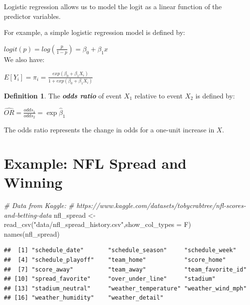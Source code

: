 \documentclass[
  11pt,
]{book}
\newenvironment{Shaded}{\begin{snugshade}}{\end{snugshade}}
\newcommand{\AttributeTok}[1]{\textcolor[rgb]{0.77,0.63,0.00}{#1}}
\newcommand{\CommentTok}[1]{\textcolor[rgb]{0.56,0.35,0.01}{\textit{#1}}}
\newcommand{\FunctionTok}[1]{\textcolor[rgb]{0.00,0.00,0.00}{#1}}
\newcommand{\NormalTok}[1]{#1}
\newcommand{\OtherTok}[1]{\textcolor[rgb]{0.56,0.35,0.01}{#1}}
\newcommand{\StringTok}[1]{\textcolor[rgb]{0.31,0.60,0.02}{#1}}
\theoremstyle{definition}
\newtheorem{definition}{Definition}[chapter]
\theoremstyle{definition}
\theoremstyle{definition}
\theoremstyle{definition}
\theoremstyle{remark}
\begin{document}
Logistic regression allows us to model the logit as a linear function of the predictor variables.

For example, a simple logistic regression model is defined by:

\(logit(p) = log\left(\frac{p}{1-p}\right) = \beta_0 + \beta_1 x\)\\

We also have:

\(E[Y_i] = \pi_i = \frac{exp(\beta_0+\beta_1X_i)}{1+exp(\beta_0+\beta_1X_i)}\)\\

\begin{definition}
The \textbf{\emph{odds ratio}} of event \(X_1\) relative to event \(X_2\) is defined by:

\(\hat{OR} = \frac{odds_1}{odds_2} = \exp{\hat{\beta}_1}\)

The odds ratio represents the change in odds for a one-unit increase in \(X\).\\

\end{definition}

\newpage

\hypertarget{example-nfl-spread-and-winning}{%
\section{Example: NFL Spread and Winning}\label{example-nfl-spread-and-winning}}

\begin{Shaded}
\begin{Highlighting}[]
\CommentTok{\# Data from Kaggle:}
\CommentTok{\# https://www.kaggle.com/datasets/tobycrabtree/nfl{-}scores{-}and{-}betting{-}data}
\NormalTok{nfl\_spread }\OtherTok{\textless{}{-}} \FunctionTok{read\_csv}\NormalTok{(}\StringTok{"data/nfl\_spread\_history.csv"}\NormalTok{,}\AttributeTok{show\_col\_types =}\NormalTok{ F)}
\FunctionTok{names}\NormalTok{(nfl\_spread)}
\end{Highlighting}
\end{Shaded}

\begin{verbatim}
##  [1] "schedule_date"       "schedule_season"     "schedule_week"      
##  [4] "schedule_playoff"    "team_home"           "score_home"         
##  [7] "score_away"          "team_away"           "team_favorite_id"   
## [10] "spread_favorite"     "over_under_line"     "stadium"            
## [13] "stadium_neutral"     "weather_temperature" "weather_wind_mph"   
## [16] "weather_humidity"    "weather_detail"
\end{verbatim}
\end{document}
